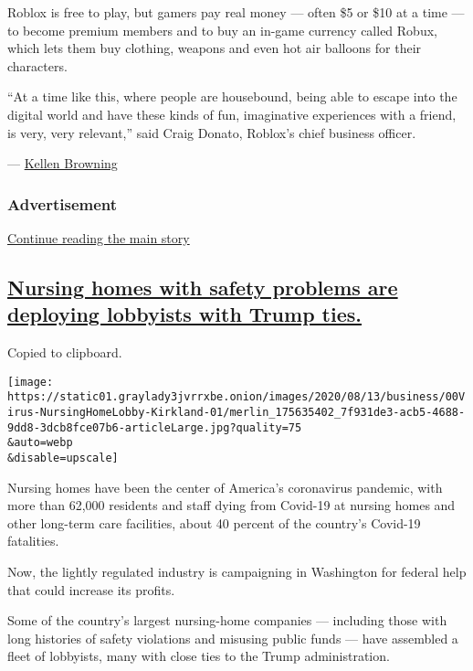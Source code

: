 Roblox is free to play, but gamers pay real money --- often \$5 or \$10
at a time --- to become premium members and to buy an in-game currency
called Robux, which lets them buy clothing, weapons and even hot air
balloons for their characters.

``At a time like this, where people are housebound, being able to escape
into the digital world and have these kinds of fun, imaginative
experiences with a friend, is very, very relevant,'' said Craig Donato,
Roblox's chief business officer.

--- \href{https://www.nytimes3xbfgragh.onion/by/kellen-browning}{Kellen
Browning}

\hypertarget{advertisement-2}{%
\subsubsection{Advertisement}\label{advertisement-2}}

\protect\hyperlink{after-dfp-ad-mid3}{Continue reading the main story}

\hypertarget{nursing-homes-with-safety-problems-are-deploying-lobbyists-with-trump-ties}{%
\subsection{\texorpdfstring{\protect\hyperlink{nursing-homes-with-safety-problems-are-deploying-lobbyists-with-trump-ties}{Nursing
homes with safety problems are deploying lobbyists with Trump
ties.}}{Nursing homes with safety problems are deploying lobbyists with Trump ties.}}\label{nursing-homes-with-safety-problems-are-deploying-lobbyists-with-trump-ties}}

Copied to clipboard.

\texttt{[image: https://static01.graylady3jvrrxbe.onion/images/2020/08/13/business/00Virus-NursingHomeLobby-Kirkland-01/merlin\_175635402\_7f931de3-acb5-4688-9dd8-3dcb8fce07b6-articleLarge.jpg?quality=75\\\&auto=webp\\\&disable=upscale]}

Nursing homes have been the center of America's coronavirus pandemic,
with more than 62,000 residents and staff dying from Covid-19 at nursing
homes and other long-term care facilities, about 40 percent of the
country's Covid-19 fatalities.

Now, the lightly regulated industry is campaigning in Washington for
federal help that could increase its profits.

Some of the country's largest nursing-home companies --- including those
with long histories of safety violations and misusing public funds ---
have assembled a fleet of lobbyists, many with close ties to the Trump
administration.


